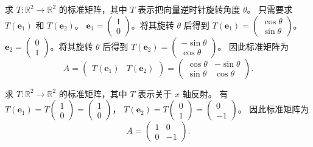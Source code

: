 \begin{example}[旋转]
求 $T:\mathbb{R}^2\to\mathbb{R}^2$ 的标准矩阵，其中 $T$ 表示把向量逆时针旋转角度 $\theta$。
只需要求 $T(\mathbf{e}_1)$ 和 $T(\mathbf{e}_2)$。
$\mathbf{e}_1=\begin{pmatrix}1\\0\end{pmatrix}$。将其旋转 $\theta$ 后得到
$T(\mathbf{e}_1)=\begin{pmatrix}\cos\theta\\\sin\theta\end{pmatrix}$。
$\mathbf{e}_2=\begin{pmatrix}0\\1\end{pmatrix}$。将其旋转 $\theta$ 后得到
$T(\mathbf{e}_2)=\begin{pmatrix}-\sin\theta\\\cos\theta\end{pmatrix}$。
因此标准矩阵为
\[
A=\begin{pmatrix}T(\mathbf{e}_1)&T(\mathbf{e}_2)\end{pmatrix}=\begin{pmatrix}\cos\theta&-\sin\theta\\\sin\theta&\cos\theta\end{pmatrix}.
\]
\end{example}

\begin{example}[反射]
求 $T:\mathbb{R}^2\to\mathbb{R}^2$ 的标准矩阵，其中 $T$ 表示关于 $x$ 轴反射。
有
$T(\mathbf{e}_1)=T\begin{pmatrix}1\\0\end{pmatrix}=\begin{pmatrix}1\\0\end{pmatrix}$，
$T(\mathbf{e}_2)=T\begin{pmatrix}0\\1\end{pmatrix}=\begin{pmatrix}0\\-1\end{pmatrix}$。
因此标准矩阵为
\[
A=\begin{pmatrix}1&0\\0&-1\end{pmatrix}.
\]
\end{example}


